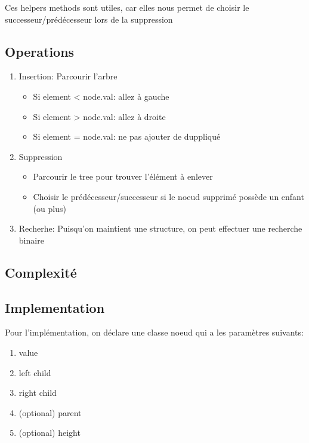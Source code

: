\documentclass{article}
\begin{document}
Ces helpers methods sont utiles, car elles nous permet de choisir le
successeur/prédécesseur lors de la suppression

\subsection{Operations}%
\label{sub:Operations}

\begin{enumerate}
    \item Insertion: Parcourir l'arbre
	\begin{itemize}
	    \item Si element < node.val: allez à gauche
	    \item Si element > node.val: allez à droite
	    \item Si element = node.val: ne pas ajouter de duppliqué
	\end{itemize}
    \item Suppression
	\begin{itemize}
	    \item Parcourir le tree pour trouver l'élément à enlever
	    \item Choisir le prédécesseur/successeur si le noeud
		supprimé possède un enfant (ou plus)
	\end{itemize}
    \item Recherhe: Puisqu'on maintient une structure, on peut effectuer
	une recherche binaire
\end{enumerate}

\subsection{Complexité}%
\label{sub:Complexité}

\subsection{Implementation}%
\label{sub:Implementation}

Pour l'implémentation, on déclare une classe noeud qui a les paramètres
suivants:
\begin{enumerate}
    \item value
    \item left child
    \item right child
    \item (optional) parent
    \item (optional) height
\end{enumerate}
\end{document}

